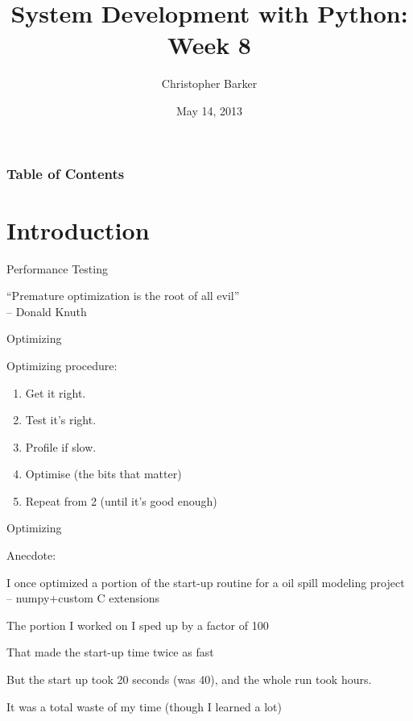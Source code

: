 \documentclass{beamer}
\title[Python Certificate: System Development]{System Development with Python: Week 8}
\author{Christopher Barker}
\institute{UW Continuing Education}
\date{May 14, 2013}
\begin{document}
\begin{frame}
  \titlepage
\end{frame}

\begin{frame}
\frametitle{Table of Contents}
  \tableofcontents
\end{frame}


\section{Introduction}

\begin{frame}[fragile]{Performance Testing}

{\Large ``Premature optimization is the root of all evil''}\\[0.1in]
{\large \hspace{0.5in} -- Donald Knuth}

\end{frame} 

\begin{frame}[fragile]{Optimizing}

{\Large Optimizing procedure:}

\begin{enumerate}
  \item Get it right.
  \item Test it's right.
  \item Profile if slow.
  \item Optimise (the bits that matter)
  \item Repeat from 2 (until it's good enough)
\end{enumerate}

\end{frame}

\begin{frame}[fragile]{Optimizing}

{\Large Anecdote:}


\vfill
{\large I once optimized a portion of the start-up routine for a oil spill modeling project -- numpy+custom C extensions}

\vfill
{\large The portion I worked on I sped up by a factor of 100}

\vfill
{\large That made the start-up time twice as fast}

\vfill
{\large But the start up took 20 seconds (was 40), and the whole run took hours.}

\vfill
{\large It was a total waste of my time (though I learned a lot)}

\end{frame}
\end{document}
